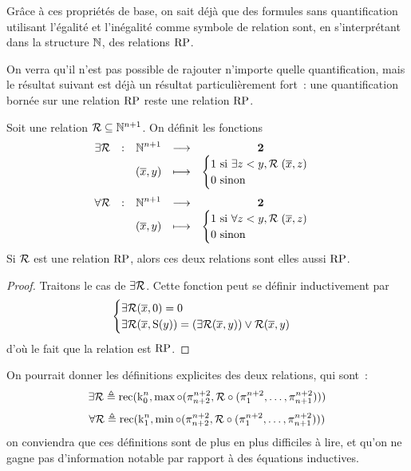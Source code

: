 Grâce à ces propriétés de base, on sait déjà que des formules sans
quantification utilisant l'égalité et l'inégalité comme symbole de relation
sont, en s'interprétant dans la structure $\mathbb N$, des relations $\operatorname{RP}$.

On verra qu'il n'est pas possible de rajouter n'importe quelle quantification,
mais le résultat suivant est déjà un résultat particulièrement fort~: une
quantification bornée sur une relation $\operatorname{RP}$ reste une relation $\operatorname{RP}$.

\begin{proposition}\label{fct.RP3}
  Soit une relation $\mathord{\mathrel{\mathcal{R}}}\subseteq \mathbb N^{n+1}$. On définit
  les fonctions
  \[\makeFun{\exists{\mathord{\varRR}}}{\bN^{n+1}}{\btwo}
            {(\vec x,y)}{\begin{cases}
                1 \text{ si } \exists z < y, \varRR(\vec x,z)\\
                0 \text{ sinon }
            \end{cases}}\]
            \[\makeFun{\forall{\mathord{\varRR}}}{\bN^{n+1}}{\btwo}
                      {(\vec x,y)}{\begin{cases}
                          1 \text{ si } \forall z < y, \varRR(\vec x,z)\\
                          0 \text{ sinon }
                      \end{cases}}\]
  Si $\mathrel{\mathcal{R}}$ est une relation $\operatorname{RP}$, alors ces deux relations sont elles
  aussi $\operatorname{RP}$.
\end{proposition}

\begin{proof}
  Traitons le cas de $\exists\mathord{\mathrel{\mathcal{R}}}$. Cette fonction peut se définir
  inductivement par
  \[\begin{cases}
  \exists\mathord{\mathrel{\mathcal{R}}}(\overline{x},0) = 0\\
  \exists\mathord{\mathrel{\mathcal{R}}}(\overline{x},\operatorname{S}(y)) =
  (\exists\mathord{\mathrel{\mathcal{R}}}(\overline{x}, y)) \lor \mathbin{\mathrel{\mathcal{R}}}(\overline{x},y)
  \end{cases}\]
  d'où le fait que la relation est $\operatorname{RP}$.
\end{proof}

\begin{remark}
  On pourrait donner les définitions explicites des deux relations, qui sont~:
  \[\exists{\mathord{\mathrel{\mathcal{R}}}} \triangleq \operatorname{rec}(\operatorname{k}_{0}^{n},\max\circ
  (\mathop{\pi_{n+2}^{n+2}},
  \mathord{\mathrel{\mathcal{R}}}\circ(\mathop{\pi_{1}^{n+2}},\ldots,\mathop{\pi_{n+1}^{n+2}})))\]
  \[\forall{\mathord{\mathrel{\mathcal{R}}}} \triangleq \operatorname{rec}(\operatorname{k}_{1}^{n},\min\circ
  (\mathop{\pi_{n+2}^{n+2}},
  \mathord{\mathrel{\mathcal{R}}}\circ(\mathop{\pi_{1}^{n+2}},\ldots,\mathop{\pi_{n+1}^{n+2}})))\]
  on conviendra que ces définitions sont de plus en plus difficiles à lire, et
  qu'on ne gagne pas d'information notable par rapport à des équations
  inductives.
\end{remark}

